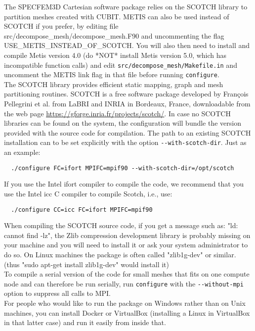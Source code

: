 The SPECFEM3D Cartesian software package relies on the SCOTCH library
to partition meshes created with CUBIT. METIS \citep{KaKu98a,KaKu98c,KaKu98b}
can also be used instead of SCOTCH if you prefer, by editing file
src/decompose\_mesh/decompose\_mesh.F90 and uncommenting the flag
USE\_METIS\_INSTEAD\_OF\_SCOTCH. You will also then need to install
and compile Metis version 4.0 (do {*}NOT{*} install Metis version
5.0, which has incompatible function calls) and edit \texttt{src/decompose\_mesh/Makefile.in}
and uncomment the METIS link flag in that file before running \texttt{configure}.\\


The SCOTCH library \citep{PeRo96} provides efficient static mapping,
graph and mesh partitioning routines. SCOTCH is a free software package
developed by Fran\c{c}ois Pellegrini et al. from LaBRI and INRIA in Bordeaux,
France, downloadable from the web page \url{https://gforge.inria.fr/projects/scotch/}.
In case no SCOTCH libraries can be found on the system, the configuration
will bundle the version provided with the source code for compilation.
The path to an existing SCOTCH installation can to be set explicitly
with the option \texttt{-{}-with-scotch-dir}. Just as an example:
\begin{verbatim}
  ./configure FC=ifort MPIFC=mpif90 --with-scotch-dir=/opt/scotch
\end{verbatim}
\noindent
If you use the Intel ifort compiler to compile the code, we recommend
that you use the Intel icc C compiler to compile Scotch, i.e., use:
\begin{verbatim}
  ./configure CC=icc FC=ifort MPIFC=mpif90
\end{verbatim}

When compiling the SCOTCH source code, if you get a message such as: "ld: cannot find -lz",
the Zlib compression development library is probably missing on your machine and you will need to install it or ask your system administrator to
do so. On Linux machines the package is often called "zlib1g-dev" or similar. (thus "sudo apt-get install zlib1g-dev" would install it)\\

To compile a serial version of the code for small meshes that fits
on one compute node and can therefore be run serially, run \texttt{configure}
with the \texttt{-{}-without-mpi} option to suppress all calls to
MPI.\\

For people who would like to run the package on Windows rather than on Unix machines, you can install Docker or VirtualBox (installing a Linux in VirtualBox in that latter case) and run it easily from inside that.\\

